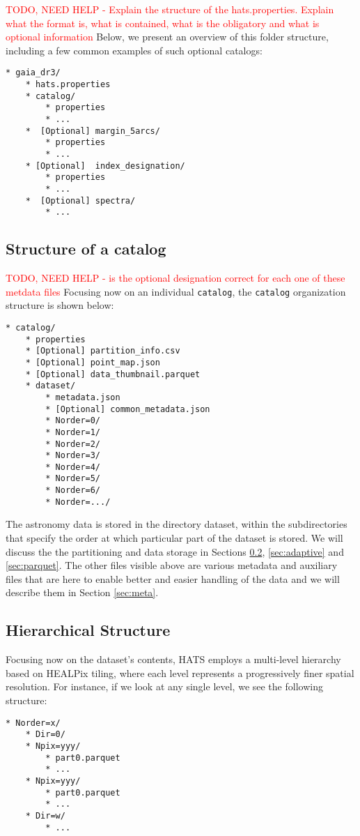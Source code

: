\documentclass[11pt,a4paper]{ivoa}
\begin{document}
\textcolor{red}{TODO, NEED HELP -  Explain the structure of the hats.properties. Explain what the format is, what is contained, what is the obligatory and what is optional information}
Below, we present an overview of this folder structure, including a few common examples of such optional catalogs:
    
\begin{verbatim}
* gaia_dr3/
    * hats.properties
    * catalog/
        * properties
        * ...
    *  [Optional] margin_5arcs/
        * properties
        * ...
    * [Optional]  index_designation/
        * properties
        * ...
    *  [Optional] spectra/
        * ...    
\end{verbatim}    
    
\subsection{Structure of a catalog} \label{sec:catalog}
\textcolor{red}{TODO, NEED HELP - is the optional designation correct for each one of these metdata files} Focusing now on an individual  \texttt{catalog}, the  \texttt{catalog} organization structure is shown below:
\begin{verbatim}
* catalog/
    * properties
    * [Optional] partition_info.csv
    * [Optional] point_map.json
    * [Optional] data_thumbnail.parquet
    * dataset/
        * metadata.json
        * [Optional] common_metadata.json
        * Norder=0/
        * Norder=1/
        * Norder=2/
        * Norder=3/
        * Norder=4/
        * Norder=5/
        * Norder=6/
        * Norder=.../
\end{verbatim}

The astronomy data is stored in the directory dataset, within the subdirectories that specify the order at which particular part of the dataset is stored. We will discuss the the partitioning and data storage in Sections \ref{sec:hierarchical}, \ref{sec:adaptive} and \ref{sec:parquet}. The other files visible above are various metadata and auxiliary files that are here to enable better and easier handling of the data and we will describe them in Section \ref{sec:meta}. 
    
\subsection{Hierarchical Structure} \label{sec:hierarchical}
        Focusing now on the dataset's contents, HATS employs a multi-level hierarchy based on HEALPix tiling, where each level represents a progressively finer spatial resolution.
For instance, if we look at any single level, we see the following structure:
\begin{verbatim}
* Norder=x/
    * Dir=0/
    * Npix=yyy/
        * part0.parquet
        * ...
    * Npix=yyy/
        * part0.parquet
        * ...
    * Dir=w/
        * ...
\end{verbatim} 
\end{document}
